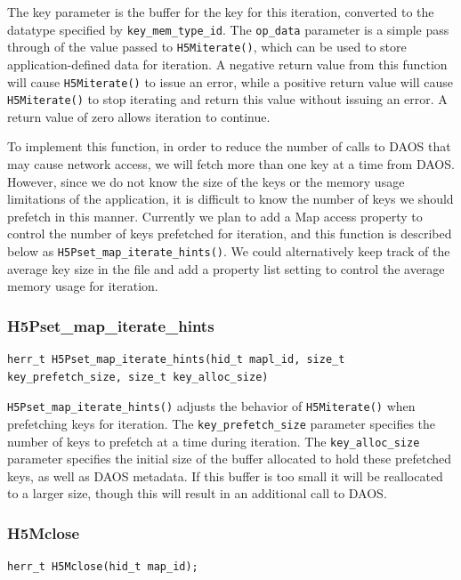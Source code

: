 The key parameter is the buffer for the key for this iteration, converted to the datatype specified by \verb+key_mem_type_id+. The \verb+op_data+ parameter is a simple pass through of the value passed to \verb+H5Miterate()+, which can be used to store application-defined data for iteration. A negative return value from this function will cause \verb+H5Miterate()+ to issue an error, while a positive return value will cause \verb+H5Miterate()+ to stop iterating and return this value without issuing an error. A return value of zero allows iteration to continue.

To implement this function, in order to reduce the number of calls to DAOS that may cause network access, we will fetch more than one key at a time from DAOS. However, since we do not know the size of the keys or the memory usage limitations of the application, it is difficult to know the number of keys we should prefetch in this manner. Currently we plan to add a Map access property to control the number of keys prefetched for iteration, and this function is described below as \verb+H5Pset_map_iterate_hints()+. We could alternatively keep track of the average key size in the file and add a property list setting to control the average memory usage for iteration.

\subsubsection{H5Pset\_map\_iterate\_hints}

{
\begin{lstlisting}
herr_t H5Pset_map_iterate_hints(hid_t mapl_id, size_t key_prefetch_size, size_t key_alloc_size)
\end{lstlisting}
}

\verb+H5Pset_map_iterate_hints()+ adjusts the behavior of \verb+H5Miterate()+ when prefetching keys for iteration. The \verb+key_prefetch_size+ parameter specifies the number of keys to prefetch at a time during iteration. The \verb+key_alloc_size+ parameter specifies the initial size of the buffer allocated to hold these prefetched keys, as well as DAOS metadata. If this buffer is too small it will be reallocated to a larger size, though this will result in an additional call to DAOS.

\subsubsection{H5Mclose}

{
\begin{lstlisting}
herr_t H5Mclose(hid_t map_id);
\end{lstlisting}
}

